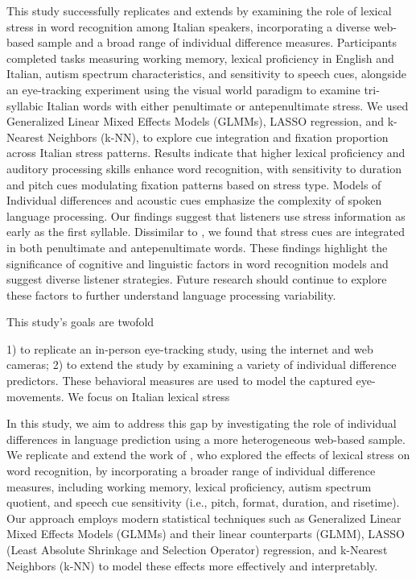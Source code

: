 This study successfully replicates and extends \cite{Sulpizio_McQueen_2012} by examining the role of lexical stress in word recognition among Italian speakers, incorporating a diverse web-based sample and a broad range of individual difference measures. Participants completed tasks measuring working memory, lexical proficiency in English and Italian, autism spectrum characteristics, and sensitivity to speech cues, alongside an eye-tracking experiment using the visual world paradigm to examine tri-syllabic Italian words with either penultimate or antepenultimate stress. We used Generalized Linear Mixed Effects Models (GLMMs), LASSO regression, and k-Nearest Neighbors (k-NN), to explore cue integration and fixation proportion across Italian stress patterns. Results indicate that higher lexical proficiency and auditory processing skills enhance word recognition, with sensitivity to duration and pitch cues modulating fixation patterns based on stress type. Models of Individual differences and acoustic cues emphasize the complexity of spoken language processing. Our findings suggest that listeners use stress information as early as the first syllable. Dissimilar to \cite{Sulpizio_McQueen_2012}, we found that stress cues are integrated in both penultimate and antepenultimate words. These findings highlight the significance of cognitive and linguistic factors in word recognition models and suggest diverse listener strategies. Future research should continue to explore these factors to further understand language processing variability.


This study's goals are twofold

1) to replicate an in-person eye-tracking study, using the internet and web cameras; 2) to extend the study by examining a variety of individual difference predictors. These behavioral measures are used to model the captured eye-movements. We focus on Italian lexical stress

In this study, we aim to address this gap by investigating the role of individual differences in language prediction using a more heterogeneous web-based sample. We replicate and extend the work of \cite{Sulpizio_McQueen_2012}, who explored the effects of lexical stress on word recognition, by incorporating a broader range of individual difference measures, including working memory, lexical proficiency, autism spectrum quotient, and speech cue sensitivity (i.e., pitch, format, duration, and risetime). Our approach employs modern statistical techniques such as Generalized Linear Mixed Effects Models (GLMMs) and their linear counterparts (GLMM), LASSO (Least Absolute Shrinkage and Selection Operator) regression, and k-Nearest Neighbors (k-NN) to model these effects more effectively and interpretably.